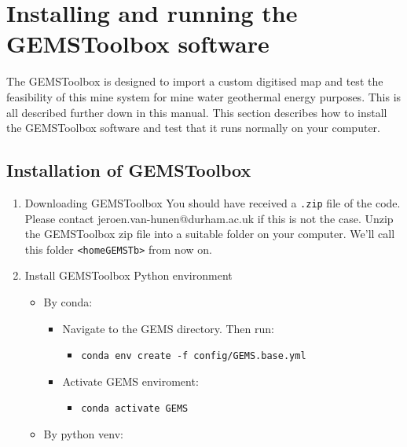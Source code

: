 \section{Installing and running the GEMSToolbox software}
The GEMSToolbox is designed to import a custom digitised map and test the feasibility of this mine system for mine water geothermal energy purposes. This is all described further down in this manual. This section describes how to install the GEMSToolbox software and test that it runs normally on your computer.


\subsection{Installation of GEMSToolbox}
\begin{enumerate}
    \item Downloading GEMSToolbox
    You should have received a {\tt.zip} file of the code. Please contact jeroen.van-hunen@durham.ac.uk if this is not the case. Unzip the GEMSToolbox zip file into a suitable folder on your computer. We'll call this folder {\tt <homeGEMSTb>} from now on.

    \item Install GEMSToolbox Python environment
    \begin{itemize}
        \item By conda:
            \begin{itemize}
                \item Navigate to the GEMS directory. Then run:
                \begin{itemize}
                    \item \texttt{conda env create -f config/GEMS.base.yml}
                \end{itemize}
                \item Activate GEMS enviroment:
                \begin{itemize}
                    \item \texttt{conda activate GEMS}
                \end{itemize}
            \end{itemize}
        \item By python venv:
            \begin{itemize}
            

\end{itemize}
\end{itemize}
\end{enumerate}
